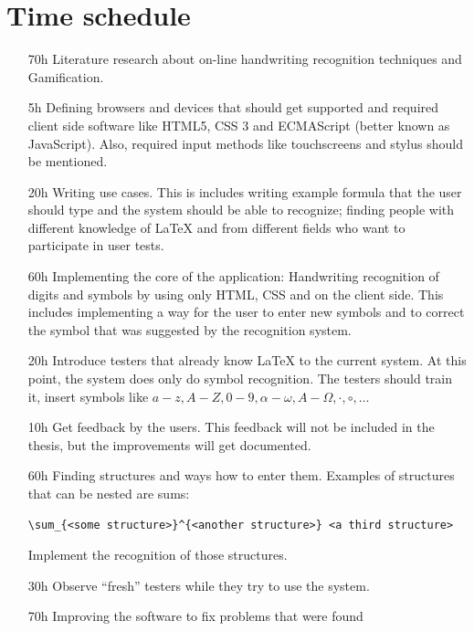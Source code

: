 \documentclass[a4paper]{scrartcl}
\begin{document}
\section{Time schedule}
\begin{itemize}
    \item[70h] Literature research about on-line handwriting recognition
               techniques and Gamification.
    \item[5h]  Defining browsers and devices that should get supported
               and required client side software like HTML5, CSS 3
               and ECMAScript (better known as JavaScript). Also,
               required input methods like touchscreens and stylus
               should be mentioned.
    \item[20h] Writing use cases. This is includes writing example
               formula that the user should type and the system should
               be able to recognize; finding people with different
               knowledge of \LaTeX{} and from different fields who
               want to participate in user tests.
    \item[60h] Implementing the core of the application: Handwriting
               recognition of digits and symbols by using only
               HTML, CSS and  on the client side. This includes implementing
               a way for the user to enter new symbols and to correct the
               symbol that was suggested by the recognition system.
    \item[20h] Introduce testers that already know \LaTeX{} to the
               current system. At this point, the system does only do
               symbol recognition. The testers should train it,
               insert symbols like $a-z, A-Z, 0-9, \alpha-\omega, A-\Omega, \cdot, \circ, \dots$
    \item[10h] Get feedback by the users. This feedback will not be included
               in the thesis, but the improvements will get documented.
    \item[60h] Finding structures and ways how to enter them. Examples
               of structures that can be nested are sums:
               \begin{verbatim}\sum_{<some structure>}^{<another structure>} <a third structure>\end{verbatim}
               Implement the recognition of those structures.
    \item[30h] Observe \enquote{fresh} testers while they try to use
               the system.
    \item[70h] Improving the software to fix problems that were found

\end{itemize}
\end{document}
